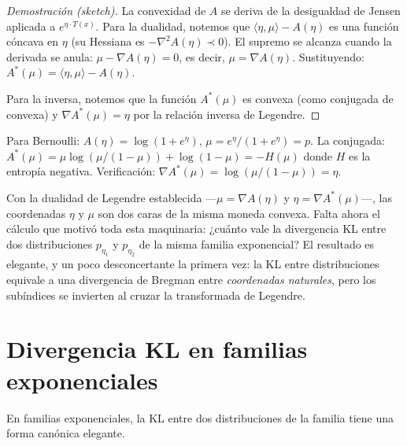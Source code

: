\begin{proof}[Demostración (sketch)]
	La convexidad de $A$ se deriva de la desigualdad de Jensen aplicada a $e^{\eta \cdot T(x)}$.  Para la dualidad, notemos que $\langle \eta, \mu \rangle - A(\eta)$ es una función cóncava en $\eta$ (su Hessiana es $-\nabla^2 A(\eta) \prec 0$).  El supremo se alcanza cuando la derivada se anula: $\mu - \nabla A(\eta) = 0$, es decir, $\mu = \nabla A(\eta)$.  Sustituyendo: $A^*(\mu) = \langle \eta, \mu \rangle - A(\eta)$.

	Para la inversa, notemos que la función $A^*(\mu)$ es convexa (como conjugada de convexa) y $\nabla A^*(\mu) = \eta$ por la relación inversa de Legendre.
\end{proof}

\begin{example}
	Para Bernoulli: $A(\eta) = \log(1+e^\eta)$, $\mu = e^\eta/(1+e^\eta) = p$.
	La conjugada: $A^*(\mu) = \mu \log(\mu/(1-\mu)) + \log(1-\mu) = -H(\mu)$ donde $H$ es la entropía negativa.
	Verificación: $\nabla A^*(\mu) = \log(\mu/(1-\mu)) = \eta$.
\end{example}

Con la dualidad de Legendre establecida ---$\mu=\nabla A(\eta)$ y $\eta=\nabla A^*(\mu)$---, las coordenadas $\eta$ y $\mu$ son dos caras de la misma moneda convexa. Falta ahora el cálculo que motivó toda esta maquinaria: ¿cuánto vale la divergencia KL entre dos distribuciones $p_{\eta_1}$ y $p_{\eta_2}$ de la misma familia exponencial? El resultado es elegante, y un poco desconcertante la primera vez: la KL entre distribuciones equivale a una divergencia de Bregman entre \emph{coordenadas naturales}, pero los subíndices se invierten al cruzar la transformada de Legendre.

\section{Divergencia KL en familias exponenciales}

En familias exponenciales, la KL entre dos distribuciones de la familia tiene una forma canónica elegante.


